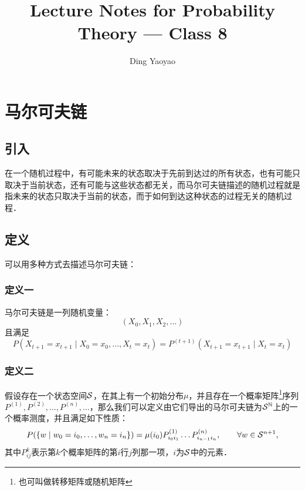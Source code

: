 

\title{Lecture Notes for Probability Theory --- Class 8}
\author{Ding Yaoyao}
\date{}


\maketitle
\tableofcontents

\newpage

\section{马尔可夫链}
	\subsection{引入}
		在一个随机过程中，有可能未来的状态取决于先前到达过的所有状态，也有可能只取决于当前状态，还有可能与这些状态都无关，而马尔可夫链描述的随机过程就是指未来的状态只取决于当前的状态，而于如何到达这种状态的过程无关的随机过程．
	\subsection{定义}
		可以用多种方式去描述马尔可夫链：
		\subsubsection{定义一} 
		马尔可夫链是一列随机变量：
		$$
			(X_0, X_1, X_2, \dots)
		$$
		且满足
		$$
			P(X_{t+1}=x_{t+1} \mid X_0=x_0,\dots,X_t=x_t) = P^{(t+1)}(X_{t+1}=x_{t+1}\mid X_t=x_t)
		$$
		\subsubsection{定义二}
		假设存在一个状态空间$\cal S$，在其上有一个初始分布$\mu$，并且存在一个概率矩阵\footnote{也可叫做转移矩阵或随机矩阵}序列
		$P^(1), P^(2), \dots, P^(n), \dots$，那么我们可以定义由它们导出的马尔可夫链为${\cal S}^{\mathbb{N}}$上的一个概率测度，并且满足如下性质：
		$$
			P(\{w \mid w_0=i_0,\dots,w_n=i_n \}) = \mu(i_0)P_{i_0i_1}^{(1)}\dots P_{i_{n-1}i_n}^{(n)}, \quad \quad \forall  w \in {\cal S}^{n+1},
		$$
		其中$P_{ij}^{k}$表示第$k$个概率矩阵的第$i$行$j$列那一项，$i$为$\cal S$中的元素．
		
